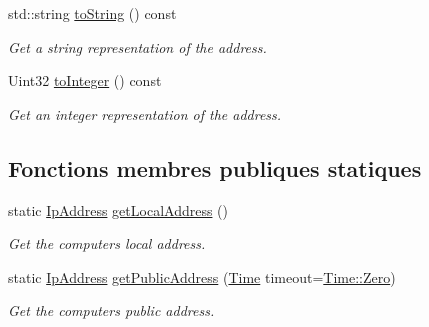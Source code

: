 \begin{DoxyCompactItemize}
std\+::string \hyperlink{classsf_1_1IpAddress_a88507954142d7fc2176cce7f36422340}{to\+String} () const
\begin{DoxyCompactList}\small\item\em Get a string representation of the address. \end{DoxyCompactList}\item 
Uint32 \hyperlink{classsf_1_1IpAddress_ae7911c5ea9562f9602c3e29cd54b15e9}{to\+Integer} () const
\begin{DoxyCompactList}\small\item\em Get an integer representation of the address. \end{DoxyCompactList}\end{DoxyCompactItemize}
\subsection*{Fonctions membres publiques statiques}
\begin{DoxyCompactItemize}
\item 
static \hyperlink{classsf_1_1IpAddress}{Ip\+Address} \hyperlink{classsf_1_1IpAddress_a4c31622ad87edca48adbb8e8ed00ee4a}{get\+Local\+Address} ()
\begin{DoxyCompactList}\small\item\em Get the computer\textquotesingle{}s local address. \end{DoxyCompactList}\item 
static \hyperlink{classsf_1_1IpAddress}{Ip\+Address} \hyperlink{classsf_1_1IpAddress_a5c5cbf67e4aacf23c24f2ad991df4c55}{get\+Public\+Address} (\hyperlink{classsf_1_1Time}{Time} timeout=\hyperlink{classsf_1_1Time_a8db127b632fa8da21550e7282af11fa0}{Time\+::\+Zero})
\begin{DoxyCompactList}\small\item\em Get the computer\textquotesingle{}s public address. \end{DoxyCompactList}\end{DoxyCompactItemize}
